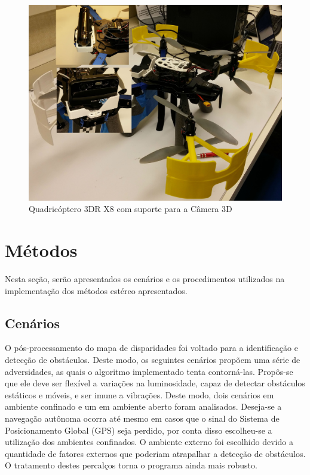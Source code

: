 \begin{figure}[H]
	\centering
	\includegraphics[scale=0.10]{./Resources/quad_camera_support.jpg}
	\caption{Quadricóptero 3DR X8 com suporte para a Câmera 3D}
	\label{quad_camera_support}
\end{figure}


\section{Métodos}

Nesta seção, serão apresentados os cenários e os procedimentos utilizados na implementação dos métodos estéreo apresentados.


\subsection{Cenários}
\label{scenes}

O pós-processamento do mapa de disparidades foi voltado para a identificação e detecção de obstáculos. Deste modo, os seguintes cenários propõem uma série de adversidades, as quais o algoritmo implementado tenta contorná-las. Propôs-se que ele deve ser flexível a variações na luminosidade, capaz de detectar obstáculos estáticos e móveis, e ser imune a vibrações. Deste modo, dois cenários em ambiente confinado e um em ambiente aberto foram analisados. Deseja-se a navegação autônoma ocorra até mesmo em casos que o sinal do Sistema de Posicionamento Global (GPS) seja perdido, por conta disso escolheu-se a utilização dos ambientes confinados. O ambiente externo foi escolhido devido a quantidade de fatores externos que poderiam atrapalhar a detecção de obstáculos. O tratamento destes percalços torna o programa ainda mais robusto.


